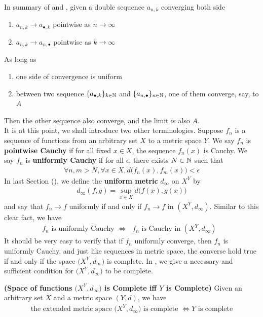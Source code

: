 \documentclass{report}
\begin{document}
\begin{mdframed}
In summary of  and , given a double sequence $a_{n,k}$ converging both side 
\begin{enumerate}[label=(\alph*)]
  \item $a_{n,k}\to a_{\bullet,k}$ pointwise as $n \to \infty$
  \item $a_{n,k}\to a_{n,\bullet}$ pointwise as $k\to \infty$
\end{enumerate}
As long as 
\begin{enumerate}[label=(\alph*)]
  \item one side of convergence is uniform 
  \item between two sequence $\{ a_{\bullet,k} \}_{k\in\mathbb{N}}$ and $\{ a_{n,\bullet} \}_{n\in\mathbb{N}}$, one of them converge, say, to $A$
\end{enumerate}
Then the other sequence also converge, and the limit is also $A$.\\

It is at this point, we shall introduce two other terminologies. Suppose $f_n$ is a sequence of functions from an arbitrary set  $X$ to a metric space  $Y$. We say $f_n$ is  \textbf{pointwise Cauchy} if for all fixed $x \in X$, the sequence $f_n(x)$ is Cauchy. We say $f_n$ is  \textbf{uniformly Cauchy} if for all $\epsilon $, there exists $N\in\mathbb{N}$ such that 
\begin{align*}
\forall n,m>N, \forall x\in X, d\big(f_n(x),f_m(x) \big)<\epsilon 
\end{align*}
In last Section (), we define the \textbf{uniform metric} $d_{\infty}$ on $X^Y$ by 
 \begin{align*}
d_{\infty}(f,g)=\sup_{x\in X}d\big(f(x),g(x) \big)
\end{align*}
and say that $f_n\to f$ uniformly if and only if $f_n\to f$ in $(X^Y,d_{\infty})$. Similar to this clear fact, we have 
\begin{align*}
f_n\text{ is uniformly Cauchy }\iff \text{ $f_n$ is Cauchy in  $(X^Y, d_\infty)$ }
\end{align*}
It should be very easy to verify that if $f_n$ uniformly converge, then $f_n$ is uniformly Cauchy, and just like sequences in metric space, the converse hold true if and only if the space $\big(X^Y,d_\infty \big)$ is complete. In , we give a necessary and sufficient condition for $\big(X^Y,d_{\infty}\big)$ to be complete. 
\end{mdframed}
\begin{theorem}
\label{Tsof}
\textbf{(Space of functions $\big(X^Y,d_{\infty}\big)$ is Complete iff $Y$ is Complete)} Given an arbitrary set $X$ and a metric space  $(Y,d)$, we have 
\begin{align*}
\text{ the extended metric space $\big(X^Y,d_{\infty} \big)$ is complete }\iff Y\text{ is complete }
\end{align*}
\end{theorem}
\end{document}
